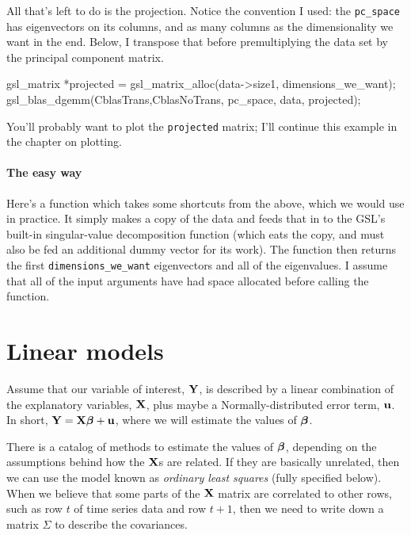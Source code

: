 All that's left to do is the projection. Notice the convention I used:
the {\tt pc\_space} has eigenvectors on its columns, and as many columns as the
dimensionality we want in the end. Below, I transpose that before premultiplying
the data set by the principal component matrix.

gsl_matrix *projected 
                 = gsl_matrix_alloc(data->size1, dimensions_we_want);
gsl_blas_dgemm(CblasTrans,CblasNoTrans, pc_space, data, projected);

You'll probably want to plot the {\tt projected} matrix; I'll continue this example in the chapter on
plotting.

\paragraph{The easy way}

Here's a function which takes some shortcuts from the above, which we would use in practice. It simply
makes a copy of the data and feeds that in to the GSL's built-in singular-value decomposition function
(which eats the copy, and must also be fed an additional dummy vector for its work). The function then
returns the first {\tt dimensions\_we\_want} eigenvectors and all of the eigenvalues. I assume that all of
the input arguments have had space allocated before calling the function.




\section{Linear models}
\label{cat}

Assume that our variable of interest, ${\bf Y}$, is
described by a linear combination of the explanatory variables, ${\bf X}$,
plus maybe a Normally-distributed error term, ${\bf u}$. In short,
${\bf Y}={\bf X}{\mbox{\boldmath$\beta$}} + {\bf u}$, where we will estimate the values of ${\mbox{\boldmath$\beta$}}$. 

There is a catalog of methods to estimate the values of ${\mbox{\boldmath$\beta$}}$,
depending on the assumptions behind how the ${\bf X}$s are related. If they
are basically unrelated, then we can use the model known as {\em ordinary
least squares} (fully specified below). When we believe that some parts
of the ${\bf X}$ matrix are correlated to other rows, such as row $t$ of 
time series data and row $t+1$, then we need to write down a matrix
$\Sigma$ to describe the covariances.

